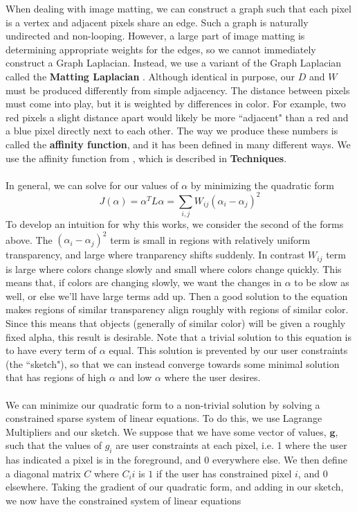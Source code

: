 When dealing with image matting, we can construct a graph such that each pixel is a vertex and adjacent pixels share an edge. Such a graph is naturally undirected and non-looping. However, a large part of image matting is determining appropriate weights for the edges, so we cannot immediately construct a Graph Laplacian. Instead, we use a variant of the Graph Laplacian called the \textbf{Matting Laplacian} \cite{levin08}.
Although identical in purpose, our $D$ and $W$ must be produced differently from simple adjacency. The distance between pixels must come into play, but it is weighted by differences in color. For example, two red pixels a slight distance apart would likely be more ``adjacent" than a red and a blue pixel directly next to each other. The way we produce these numbers is called the \textbf{affinity function}, and it has been defined in many different ways. We use the affinity function from \cite{levin08}, which is described in \textbf{Techniques}.
\\\\
In general, we can solve for our values of $\alpha$ by minimizing the quadratic form
\[J(\alpha)=\alpha^T L\alpha=\sum_{i,j}W_{ij}(\alpha_i-\alpha_j)^2\]
To develop an intuition for why this works, we consider the second of the forms above. The $(\alpha_i-\alpha_j)^2$ term is small in regions with relatively uniform transparency, and large where tranparency shifts suddenly. In contrast $W_{ij}$ term is large where colors change slowly and small where colors change quickly. This means that, if colors are changing slowly, we want the changes in $\alpha$ to be slow as well, or else we'll have large terms add up. Then a good solution to the equation makes regions of similar transparency align roughly with regions of similar color. Since this means that objects (generally of similar color) will be given a roughly fixed alpha, this result is desirable. Note that a trivial solution to this equation is to have every term of $\alpha$ equal. This solution is prevented by our user constraints (the ``sketch"), so that we can instead converge towards some minimal solution that has regions of high $\alpha$ and low $\alpha$ where the user desires.
\\\\
We can minimize our quadratic form to a non-trivial solution by solving a constrained sparse system of linear equations.  To do this, we use Lagrange Multipliers and our sketch.
We suppose that we have some vector of values, $\textbf{g}$, such that the values of $g_i$ are user constraints at each pixel, i.e. 1 where the user has indicated a pixel is in the foreground, and 0 everywhere else. We then define a diagonal matrix $C$ where $C_ii$ is $1$ if the user has constrained pixel $i$, and $0$ elsewhere. Taking the gradient of our quadratic form, and adding in our sketch, we now have the constrained system of linear equations
